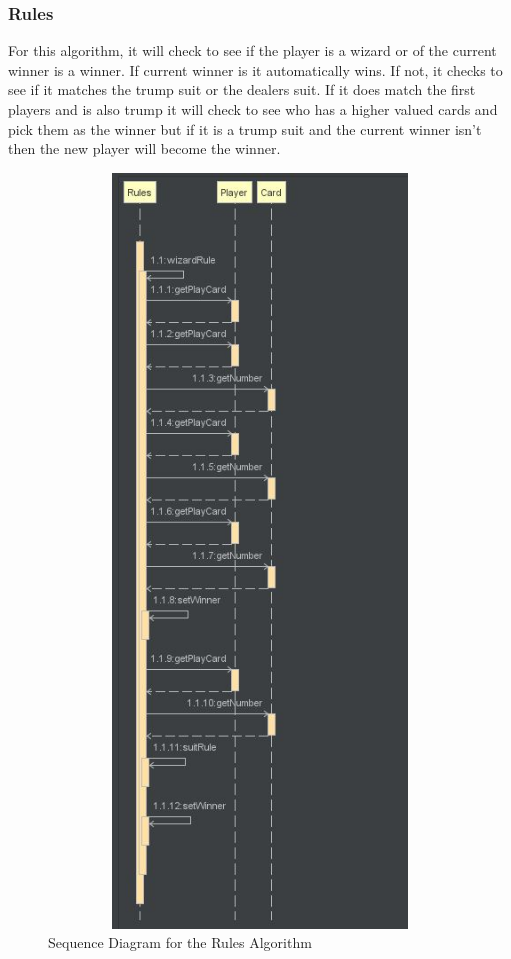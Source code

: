 \subsubsection{Rules}
For this algorithm, it will check to see if the player is a wizard or of the current winner is a winner. If current winner is it automatically wins. If not, it checks to see if it matches the trump suit or the dealers suit. If it does match the first players and is also trump it will check to see who has a higher valued cards and pick them as the winner but if it is a trump suit and the current winner isn’t then the new player will become the winner.
\begin{figure}
\centering
\includegraphics[width=15cm ,height=20cm,keepaspectratio]{RuleSequenceDiagram}
\caption{Sequence Diagram for the Rules Algorithm}
\label{fig:Rules}
\end{figure}
